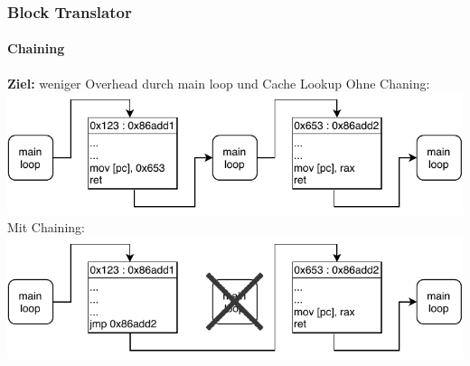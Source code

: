 \documentclass[german]{tum-presentation}
\begin{document}
\begin{frame}[fragile]
	\frametitle{Block Translator}
	\framesubtitle{Chaining}
	\textbf{Ziel:} weniger Overhead durch main loop und Cache Lookup
	\pause
	Ohne Chaning:
	\includegraphics[width=\textwidth]{diagrams/unchained}
	\pause
	Mit Chaining:
	\includegraphics[width=\textwidth]{diagrams/chained}
\end{frame}
\end{document}
